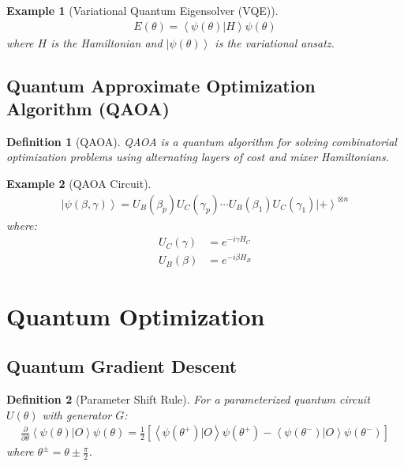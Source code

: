 \documentclass[11pt]{article}
\newtheorem{definition}{Definition}[section]
\newtheorem{example}{Example}[section]
\newcommand{\ket}[1]{\left|#1\right\rangle}
\newcommand{\braket}[2]{\left\langle#1|#2\right\rangle}
\begin{document}
\begin{example}[Variational Quantum Eigensolver (VQE)]
\begin{align}
E(\theta) = \braket{\psi(\theta)}{H}{\psi(\theta)}
\end{align}
where $H$ is the Hamiltonian and $\ket{\psi(\theta)}$ is the variational ansatz.
\end{example}

\subsection{Quantum Approximate Optimization Algorithm (QAOA)}

\begin{definition}[QAOA]
QAOA is a quantum algorithm for solving combinatorial optimization problems using alternating layers of cost and mixer Hamiltonians.
\end{definition}

\begin{example}[QAOA Circuit]
\begin{align}
\ket{\psi(\beta, \gamma)} = U_B(\beta_p) U_C(\gamma_p) \cdots U_B(\beta_1) U_C(\gamma_1) \ket{+}^{\otimes n}
\end{align}
where:
\begin{align}
U_C(\gamma) &= e^{-i\gamma H_C} \\
U_B(\beta) &= e^{-i\beta H_B}
\end{align}
\end{example}

\section{Quantum Optimization}

\subsection{Quantum Gradient Descent}

\begin{definition}[Parameter Shift Rule]
For a parameterized quantum circuit $U(\theta)$ with generator $G$:
\begin{align}
\frac{\partial}{\partial \theta} \braket{\psi(\theta)}{O}{\psi(\theta)} = \frac{1}{2}[\braket{\psi(\theta^+)}{O}{\psi(\theta^+)} - \braket{\psi(\theta^-)}{O}{\psi(\theta^-)}]
\end{align}
where $\theta^{\pm} = \theta \pm \frac{\pi}{2}$.
\end{definition}
\end{document}
